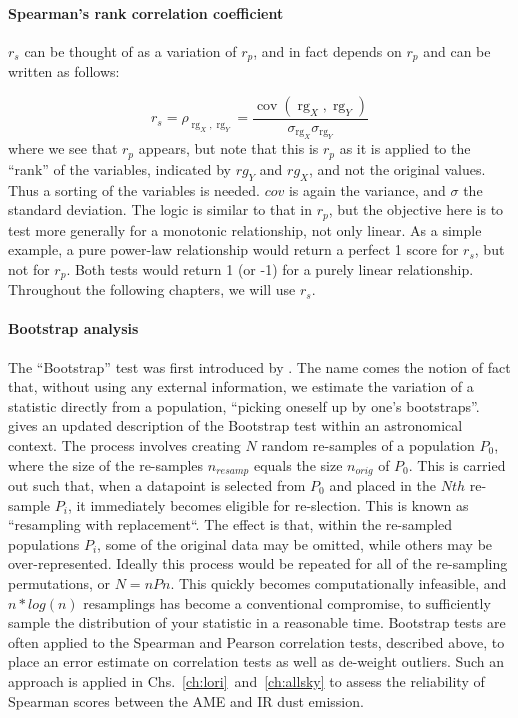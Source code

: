     \paragraph{Spearman's rank correlation coefficient}
     $r_{s}$ can be thought of as a variation of $r_{p}$, and in fact depends on $r_{p}$ and can be written as follows:

       \begin{equation}
         r_s = \rho_{\operatorname{rg}_X,\operatorname{rg}_Y} = \frac {\operatorname{cov}(\operatorname{rg}_X,\operatorname{rg}_Y)} { \sigma_{\operatorname{rg}_X} \sigma_{\operatorname{rg}_Y} }
       \end{equation}
       where we see that $r_{p}$ appears, but note that this is $r_{p}$ as it is applied to the ``rank'' of the variables, indicated by $rg_{Y}$ and $rg_{X}$, and not the original values. Thus a sorting of the variables is needed. $cov$ is again the variance, and $\sigma{}$ the standard deviation.
       The logic is similar to that in $r_{p}$, but the objective here is to test more generally for a monotonic relationship, not only linear. As a simple example, a pure power-law relationship would return a perfect 1 score for $r_{s}$, but not for $r_{p}$. Both tests would return 1 (or -1) for a purely linear relationship. Throughout the following chapters, we will use $r_{s}$.

    \paragraph{Bootstrap analysis}
    The ``Bootstrap'' test was first introduced by \cite{efron79}. The name comes the notion of fact that, without using any external information, we estimate the variation of a statistic directly from a population, ``picking oneself up by one's bootstraps''. \cite{feigelson13} gives an updated description of the Bootstrap test within an astronomical context. The process involves creating $N$ random re-samples of a population $P_{0}$, where the size of the re-samples $n_{resamp}$ equals the size $n_{orig}$ of $P_{0}$. This is carried out such that, when a datapoint is selected from $P_{0}$ and placed in the $Nth$ re-sample $P_{i}$, it immediately becomes eligible for re-slection. This is known as ``resampling with replacement``. The effect is that, within the re-sampled populations $P_{i}$, some of the original data may be omitted, while others may be over-represented. Ideally this process would be repeated for all of the re-sampling permutations, or $N = nPn$. This quickly becomes computationally infeasible, and $n*log(n)$ resamplings has become a conventional compromise, to sufficiently sample the distribution of your statistic in a reasonable time. Bootstrap tests are often applied to the Spearman and Pearson correlation tests, described above, to place an error estimate on correlation tests as well as de-weight outliers. Such an approach is applied in Chs.~\ref{ch:lori}~and~\ref{ch:allsky} to assess the reliability of Spearman scores between the AME and IR dust emission.
